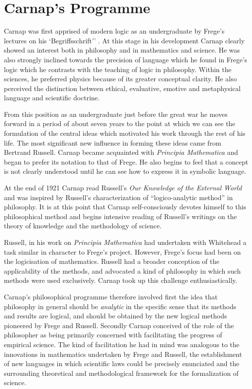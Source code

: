 \section{Carnap's Programme}

Carnap was first apprised of modern logic as an undergraduate by
Frege's lectures on his `Begriffsschrift''
\cite{frege1879,heijenoort67}. 
At this stage in his development Carnap clearly showed an interest
both in philosophy and in mathematics and science. 
He was also strongly inclined towards the precision of language which
he found in Frege's logic which he contrasts with the teaching of
logic in philosophy. 
Within the sciences, he preferred physics because of its greater
conceptual clarity. 
He also perceived the distinction between ethical, evaluative, emotive
and metaphysical language and scientific doctrine. 

From this position as an undergraduate just before the great war he
moves forward in a period of about seven years to the point at which
we can see the formulation of the central ideas which motivated his
work through the rest of his life. 
The most significant new influence in forming these ideas came from
Bertrand Russell. 
Carnap became acquainted with \emph{Principia
  Mathematica}\cite{russell10} and began to prefer its notation to
that of Frege. 
He also begins to feel that a concept is not clearly understood until
he can see how to express it in symbolic language. 

At the end of 1921 Carnap read Russell's \emph{Our Knowledge of the
  External World}\cite{russell1921} and was inspired by Russell's
characterization of ``logico-analytic method'' in philosophy. 
It is at this point that Carnap self-consciously devotes himself to
this philosophical method and begins intensive reading of Russell's
writings on the theory of knowledge and the methodology of science. 

Russell, in his work on \emph{Principia Mathematica} had undertaken
with Whitehead a task similar in character to Frege's project. 
However, Frege's focus had been on the logicisation of mathematics.
Russell had a broader conception of the applicability of the methods,
and advocated a kind of philosophy in which such methods were used
exclusively. 
Carnap took up this challenge enthusiastically.

Carnap's philosophical programme therefore involved first the idea
that philosophy in general should be \emph{analytic} in the specific
sense that its methods and results are logical, and should be obtained
by the new logical methods pioneered by Frege and Russell. 
Secondly Carnap conceived of the role of the philosopher as being
primarily concerned with facilitating the progress of empirical
science. 
The kind of facilitation he had in mind was analogous to the
innovations in mathematics undertaken by Frege and Russell, the
establishment of new languages in which scientific laws could be
precisely enunciated and the surrounding theoretical and
methodological framework for the formalization of science. 

